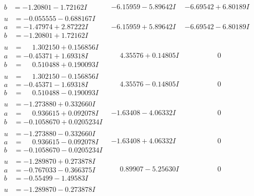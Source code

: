 \documentclass[1p]{elsarticle_modified}
\theoremstyle{definition}
\begin{document}
$$\begin{array}{c|c|c}
\begin{aligned}
b &= -1.20801 - 1.72162 I\end{aligned}
 & -6.15959 - 5.89642 I & -6.69542 + 6.80189 I \\ \hline\begin{aligned}
u &= -0.055555 - 0.688167 I \\
a &= -1.47974 + 2.87222 I \\
b &= -1.20801 + 1.72162 I\end{aligned}
 & -6.15959 + 5.89642 I & -6.69542 - 6.80189 I \\ \hline\begin{aligned}
u &= \phantom{-}1.302150 + 0.156856 I \\
a &= -0.45371 + 1.69318 I \\
b &= \phantom{-}0.510488 + 0.190093 I\end{aligned}
 & \phantom{-}4.35576 + 0.14805 I & \phantom{-0.000000 } 0 \\ \hline\begin{aligned}
u &= \phantom{-}1.302150 - 0.156856 I \\
a &= -0.45371 - 1.69318 I \\
b &= \phantom{-}0.510488 - 0.190093 I\end{aligned}
 & \phantom{-}4.35576 - 0.14805 I & \phantom{-0.000000 } 0 \\ \hline\begin{aligned}
u &= -1.273880 + 0.332660 I \\
a &= \phantom{-}0.936615 + 0.092078 I \\
b &= -0.1058670 + 0.0205234 I\end{aligned}
 & -1.63408 - 4.06332 I & \phantom{-0.000000 } 0 \\ \hline\begin{aligned}
u &= -1.273880 - 0.332660 I \\
a &= \phantom{-}0.936615 - 0.092078 I \\
b &= -0.1058670 - 0.0205234 I\end{aligned}
 & -1.63408 + 4.06332 I & \phantom{-0.000000 } 0 \\ \hline\begin{aligned}
u &= -1.289870 + 0.273878 I \\
a &= -0.767033 - 0.366375 I \\
b &= -0.55499 - 1.49583 I\end{aligned}
 & \phantom{-}0.89907 - 5.25630 I & \phantom{-0.000000 } 0 \\ \hline\begin{aligned}
u &= -1.289870 - 0.273878 I \\

\end{aligned}
\end{array}$$
\end{document}
